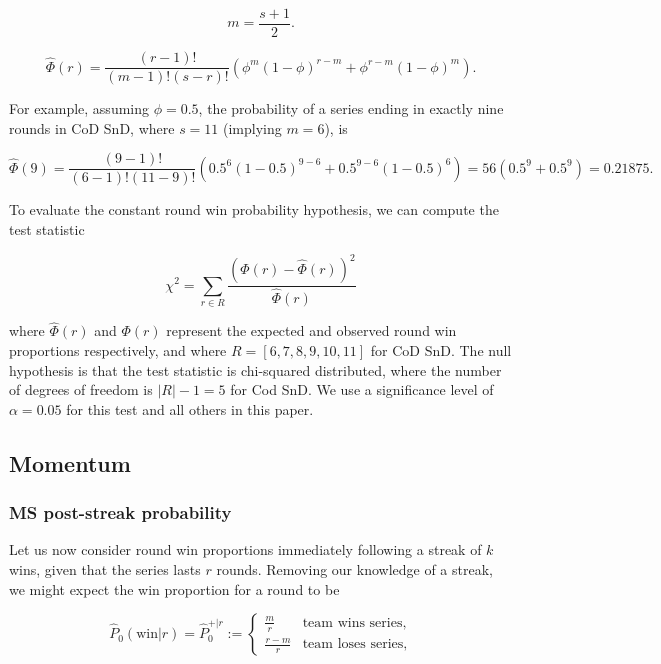 \documentclass{article}
\begin{document}
\begin{equation}\label{eq:m}
m = \frac{s + 1}{2}.
\end{equation}

\begin{equation}\label{eq:series-length}
\hat{\Phi}(r) = \frac{(r - 1)!}{(m - 1)!(s - r)!}(\phi^{m}(1 - \phi)^{r - m} + \phi^{r - m}(1 - \phi)^m).
\end{equation}

For example, assuming \(\phi = 0.5\), the probability of a series ending
in exactly nine rounds in CoD SnD, where \(s=11\) (implying \(m=6\)), is

\[
\hat{\Phi}(9) = \frac{(9 - 1)!}{(6 - 1)!(11 - 9)!}(0.5^{6}(1 - 0.5)^{9 - 6} + 0.5^{9 - 6}(1 - 0.5)^6) = 56 (0.5^9 + 0.5^9) = 0.21875.
\]

To evaluate the constant round win probability hypothesis, we can
compute the test statistic

\begin{equation}\label{eq:chi-squ}
\chi^2 = \sum_{r \in R} \frac{(\Phi(r) - \hat{\Phi}(r))^2}{\hat{\Phi}(r)}
\end{equation}

where \(\hat{\Phi}(r)\) and \(\Phi(r)\) represent the expected and
observed round win proportions respectively, and where
\(R = [6, 7, 8, 9, 10, 11]\) for CoD SnD. The null hypothesis is that
the test statistic is chi-squared distributed, where the number of
degrees of freedom is \(\vert R \vert -1 = 5\) for Cod SnD. We use a
significance level of \(\alpha = 0.05\) for this test and all others in
this paper.

\hypertarget{momentum}{%
\subsection{Momentum}\label{momentum}}

\hypertarget{ms-post-streak-probability}{%
\subsubsection{MS post-streak
probability}\label{ms-post-streak-probability}}

Let us now consider round win proportions immediately following a streak
of \(k\) wins, given that the series lasts \(r\) rounds. Removing our
knowledge of a streak, we might expect the win proportion for a round to
be

\begin{equation}\label{eq:pwr}
\hat{P}_0(\text{win} | r) = \hat{P}^{+|r}_0 := \begin{cases} 
\frac{m}{r} & \text{team wins series}, \\ 
\frac{r - m}{r} & \text{team loses series},
\end{cases}
\end{equation}
\end{document}
